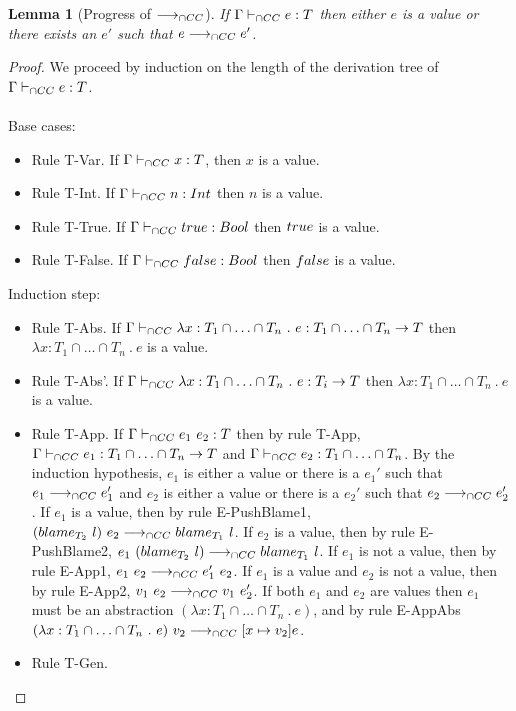 \documentclass[a4paper]{article}
\newtheorem{lemma}{Lemma}
\begin{document}
\begin{lemma}[Progress of $\longrightarrow_{\cap CC}$]
\label{progress}
If $\Gamma \vdash_{\cap CC} e : T$ then either $e$ is a value or there exists an $e'$ such that $e \longrightarrow_{\cap CC} e'$.
\end{lemma}
\begin{proof}
We proceed by induction on the length of the derivation tree of $\Gamma \vdash_{\cap CC} e : T$.\\\\
Base cases:
\begin{itemize}
    \item Rule T-Var.
    If $\Gamma \vdash_{\cap CC} x : T$, then $x$ is a value.
    \item Rule T-Int.
    If  $\Gamma \vdash_{\cap CC} n : {Int}$ then $n$ is a value.
    \item Rule T-True.
    If $\Gamma \vdash_{\cap CC} true : Bool$ then $true$ is a value.
    \item Rule T-False.
    If $\Gamma \vdash_{\cap CC} false : Bool$ then $false$ is a value.
\end{itemize}
Induction step:
\begin{itemize}
    \item Rule T-Abs.
    If $\Gamma \vdash_{\cap CC} \lambda x : T_1 \cap \ldots \cap T_n\ .\ e : T_1 \cap \ldots \cap T_n \rightarrow T$ then $\lambda x : T_1 \cap \ldots \cap T_n\ .\ e$ is a value.
    \item Rule T-Abs'.
    If $\Gamma \vdash_{\cap CC} \lambda x : T_1 \cap \ldots \cap T_n\ .\ e : T_i \rightarrow T$ then $\lambda x : T_1 \cap \ldots \cap T_n\ .\ e$ is a value.
    \item Rule T-App.
    If $\Gamma \vdash_{\cap CC} e_1\ e_2 : T$ then by rule T-App, $\Gamma \vdash_{\cap CC} e_1 : T_1 \cap \ldots \cap T_n \rightarrow T$ and $\Gamma \vdash_{\cap CC} e_2 : T_1 \cap \ldots \cap T_n$.
    By the induction hypothesis, $e_1$ is either a value or there is a $e_1'$ such that $e_1 \longrightarrow_{\cap CC} e_1'$ and $e_2$ is either a value or there is a $e_2'$ such that $e_2 \longrightarrow_{\cap CC} e_2'$.
    If $e_1$ is a value, then by rule E-PushBlame1, $(blame_{T_2}\ l)\ e_2 \longrightarrow_{\cap CC} blame_{T_1}\ l$.
    If $e_2$ is a value, then by rule E-PushBlame2, $e_1\ (\blame{T_2}{l}) \gios \blame{T_1}{l}$.
    If $e_1$ is not a value, then by rule E-App1, $e_1\ e_2 \longrightarrow_{\cap CC} e_1'\ e_2$.
    If $e_1$ is a value and $e_2$ is not a value, then by rule E-App2, $v_1\ e_2 \longrightarrow_{\cap CC} v_1\ e_2'$.
    If both $e_1$ and $e_2$ are values then $e_1$ must be an abstraction $(\lambda x : T_1 \cap \ldots \cap T_n\ .\ e)$, and by rule E-AppAbs $(\lambda x : T_1 \cap \ldots \cap T_n\ .\ e)\ v_2 \longrightarrow_{\cap CC} [x \mapsto v_2]e$.
    \item Rule T-Gen.

\end{itemize}
\end{proof}
\end{document}
